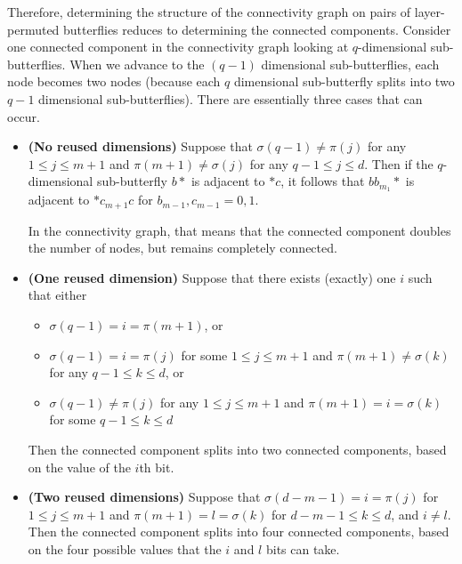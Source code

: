 \documentclass[12pt]{article}
\begin{document}
Therefore, determining the structure of the connectivity graph on pairs
of layer-permuted butterflies reduces to determining the connected components.
Consider one connected component in the connectivity graph looking at
$q$-dimensional sub-butterflies.  When we advance to the 
$(q-1)$ dimensional sub-butterflies, each node becomes two nodes (because each
$q$ dimensional sub-butterfly splits into two $q-1$ dimensional 
sub-butterflies).  There are  essentially three cases that can occur.
\begin{itemize} \label{three cases}
\item \textbf{(No reused dimensions)}
Suppose that 
$\sigma(q-1) \neq \pi(j)$ for any $1 \leq j \leq m+1$ and
$\pi(m+1) \neq \sigma(j)$ for any $q-1 \leq j \leq d$.
Then if the $q$-dimensional sub-butterfly $b*$ is adjacent
to $*c$, it follows that $bb_{m_1}*$ is adjacent to 
$*c_{m+1}c$ for $b_{m-1}, c_{m-1} = 0,1$.  

In the connectivity graph, that means that the connected component doubles
the number of nodes, but remains completely connected.
\item \textbf{(One reused dimension)}
Suppose that there exists (exactly) one $i$ such that either 
\begin{itemize}
\item
$\sigma(q-1) = i = \pi(m+1)$, or
\item
$\sigma(q-1) = i = \pi(j)$ for some $1 \leq j \leq m+1$ and
$\pi(m+1) \neq \sigma(k)$ for any $q-1 \leq k \leq d$, or
\item
$\sigma(q-1) \neq \pi(j)$ for any $1 \leq j \leq m+1$ and
$\pi(m+1) = i = \sigma(k)$ for some $q-1 \leq k \leq d$
\end{itemize}
Then the connected component splits into two connected components,
based on the value of the $i$th bit.
\item  \textbf{(Two reused dimensions)}
Suppose that $\sigma(d-m-1) = i = \pi(j)$ for $1 \leq j \leq m+1$ and
$\pi(m+1) = l = \sigma(k)$ for $d-m-1 \leq k \leq d$, and $i \neq l$.
Then the connected component splits into four connected components, based
on the four possible values that the $i$ and $l$ bits can take.
\end{itemize}
\end{document}

